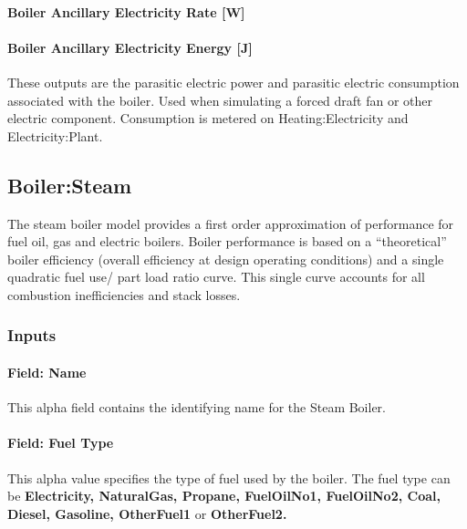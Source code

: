 \paragraph{Boiler Ancillary Electricity Rate {[}W{]}}\label{boiler-ancillary-electric-power-w}

\paragraph{Boiler Ancillary Electricity Energy {[}J{]}}\label{boiler-ancillary-electric-energy-j}

These outputs are the parasitic electric power and parasitic electric consumption associated with the boiler. Used when simulating a forced draft fan or other electric component. Consumption is metered on Heating:Electricity and Electricity:Plant.

\subsection{Boiler:Steam}\label{boilersteam}

The steam boiler model provides a first order approximation of performance for fuel oil, gas and electric boilers. Boiler performance is based on a ``theoretical'' boiler efficiency (overall efficiency at design operating conditions) and a single quadratic fuel use/ part load ratio curve. This single curve accounts for all combustion inefficiencies and stack losses.

\subsubsection{Inputs}\label{inputs-11-012}

\paragraph{Field: Name}\label{field-name-10-011}

This alpha field contains the identifying name for the Steam Boiler.

\paragraph{Field: Fuel Type}\label{field-fuel-type-4}

This alpha value specifies the type of fuel used by the boiler. The fuel type can be \textbf{Electricity, NaturalGas, Propane, FuelOilNo1, FuelOilNo2, Coal, Diesel, Gasoline, OtherFuel1} or \textbf{OtherFuel2.}


